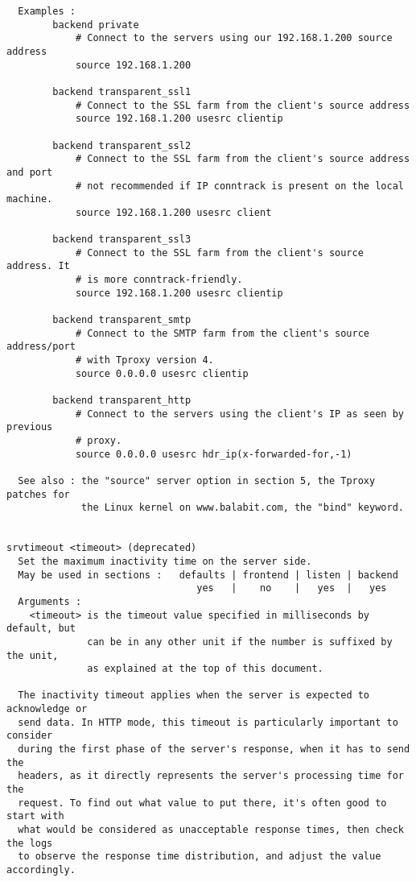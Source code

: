 \begin{verbatim}
  Examples :
        backend private
            # Connect to the servers using our 192.168.1.200 source address
            source 192.168.1.200

        backend transparent_ssl1
            # Connect to the SSL farm from the client's source address
            source 192.168.1.200 usesrc clientip

        backend transparent_ssl2
            # Connect to the SSL farm from the client's source address and port
            # not recommended if IP conntrack is present on the local machine.
            source 192.168.1.200 usesrc client

        backend transparent_ssl3
            # Connect to the SSL farm from the client's source address. It
            # is more conntrack-friendly.
            source 192.168.1.200 usesrc clientip

        backend transparent_smtp
            # Connect to the SMTP farm from the client's source address/port
            # with Tproxy version 4.
            source 0.0.0.0 usesrc clientip

        backend transparent_http
            # Connect to the servers using the client's IP as seen by previous
            # proxy.
            source 0.0.0.0 usesrc hdr_ip(x-forwarded-for,-1)

  See also : the "source" server option in section 5, the Tproxy patches for
             the Linux kernel on www.balabit.com, the "bind" keyword.


srvtimeout <timeout> (deprecated)
  Set the maximum inactivity time on the server side.
  May be used in sections :   defaults | frontend | listen | backend
                                 yes   |    no    |   yes  |   yes
  Arguments :
    <timeout> is the timeout value specified in milliseconds by default, but
              can be in any other unit if the number is suffixed by the unit,
              as explained at the top of this document.

  The inactivity timeout applies when the server is expected to acknowledge or
  send data. In HTTP mode, this timeout is particularly important to consider
  during the first phase of the server's response, when it has to send the
  headers, as it directly represents the server's processing time for the
  request. To find out what value to put there, it's often good to start with
  what would be considered as unacceptable response times, then check the logs
  to observe the response time distribution, and adjust the value accordingly.


\end{verbatim}
